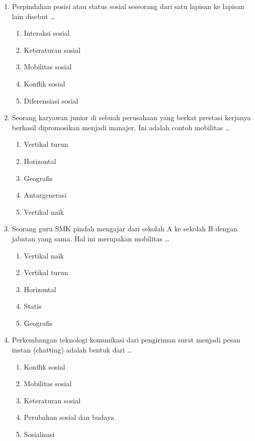 \documentclass[12pt,a4paper]{article}
\begin{document}
\begin{enumerate}[leftmargin=*]
\item Perpindahan posisi atau status sosial seseorang dari satu lapisan ke lapisan lain disebut \dots
    \begin{enumerate}[label=\alph*.]
        \item Interaksi sosial
        \item Keteraturan sosial
        \item Mobilitas sosial
        \item Konflik sosial
        \item Diferensiasi sosial
    \end{enumerate}

\item Seorang karyawan junior di sebuah perusahaan yang berkat prestasi kerjanya berhasil dipromosikan menjadi manajer. Ini adalah contoh mobilitas \dots
    \begin{enumerate}[label=\alph*.]
        \item Vertikal turun
        \item Horizontal
        \item Geografis
        \item Antargenerasi
        \item Vertikal naik
    \end{enumerate}

\item Seorang guru SMK pindah mengajar dari sekolah A ke sekolah B dengan jabatan yang sama. Hal ini merupakan mobilitas \dots
    \begin{enumerate}[label=\alph*.]
        \item Vertikal naik
        \item Vertikal turun
        \item Horizontal
        \item Statis
        \item Geografis
    \end{enumerate}

\item Perkembangan teknologi komunikasi dari pengiriman surat menjadi pesan instan (chatting) adalah bentuk dari \dots
    \begin{enumerate}[label=\alph*.]
        \item Konflik sosial
        \item Mobilitas sosial
        \item Keteraturan sosial
        \item Perubahan sosial dan budaya
        \item Sosialisasi
    \end{enumerate}


\end{enumerate}
\end{document}
